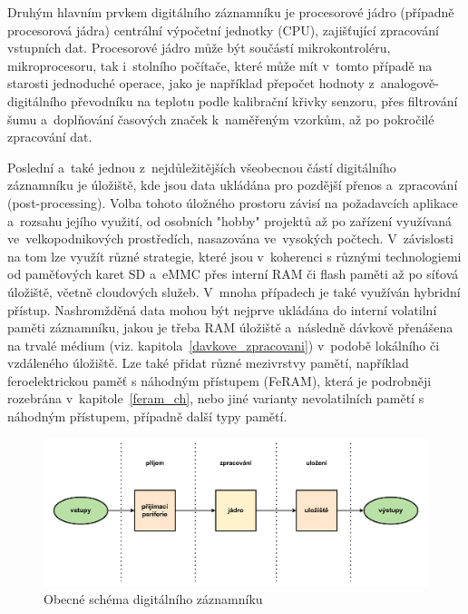 Druhým hlavním prvkem digitálního záznamníku je procesorové jádro (případně procesorová jádra) centrální výpočetní jednotky (CPU), zajišťující zpracování vstupních dat. Procesorové jádro může být součástí mikrokontroléru, mikroprocesoru, tak i~stolního počítače, které může mít v~tomto případě na starosti jednoduché operace, jako je například přepočet hodnoty z~analogově-digitálního převodníku na teplotu podle kalibrační křivky senzoru, přes filtrování šumu a~doplňování časových značek k~naměřeným vzorkům, až po pokročilé zpracování dat.~\cite{smart_datalogger_data_acquisition_cpu, researchgate_general_dataloggger_multiple_sdcards}

\newpage

Poslední a~také jednou z~nejdůležitějších všeobecnou částí digitálního záznamníku je úložiště, kde jsou data ukládána pro pozdější přenos a~zpracování (post-processing). Volba tohoto úložného prostoru závisí na požadavcích aplikace a~rozsahu jejího využití, od osobních "hobby" projektů až po zařízení využívaná ve~velkopodnikových prostředích, nasazována ve~vysokých počtech. V~závislosti na tom lze využít různé strategie, které jsou v~koherenci s různými technologiemi od paměťových karet SD a~eMMC přes interní RAM či flash paměti až po síťová úložiště, včetně cloudových služeb. V~mnoha případech je také využíván hybridní přístup. Nashromžděná data mohou být nejprve ukládána do interní volatilní paměti záznamníku, jakou je třeba RAM úložiště a~následně dávkově přenášena na trvalé médium (viz. kapitola~\ref{davkove_zpracovani}) v~podobě lokálního či vzdáleného úložiště. Lze také přidat různé mezivrstvy pamětí, například feroelektrickou paměť s náhodným přístupem (FeRAM), která je podrobněji rozebrána v~kapitole~\ref{feram_ch}, nebo jiné varianty nevolatilních pamětí s náhodným přístupem, případně další typy pamětí.~\cite{datalogger_sd_mmc_usb_flash_disk, researchgate_general_dataloggger_multiple_sdcards, rta_local_vs_cloud}

\begin{figure}[h]
    \centering
    \includegraphics[width=1.00\textwidth]{obrazky-figures/common_digital_datalogger_scheme.pdf}
    \caption{Obecné schéma digitálního záznamníku}
    \label{fig:common-digital-datalogger}
\end{figure}



